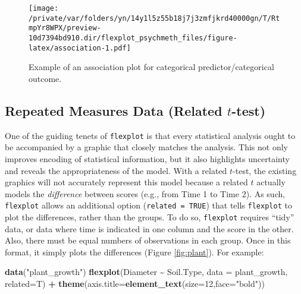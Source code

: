 \documentclass[
  english,
  man]{apa6}
\newenvironment{Shaded}{\begin{snugshade}}{\end{snugshade}}
\newcommand{\DataTypeTok}[1]{\textcolor[rgb]{0.13,0.29,0.53}{#1}}
\newcommand{\DecValTok}[1]{\textcolor[rgb]{0.00,0.00,0.81}{#1}}
\newcommand{\KeywordTok}[1]{\textcolor[rgb]{0.13,0.29,0.53}{\textbf{#1}}}
\newcommand{\NormalTok}[1]{#1}
\newcommand{\OperatorTok}[1]{\textcolor[rgb]{0.81,0.36,0.00}{\textbf{#1}}}
\newcommand{\StringTok}[1]{\textcolor[rgb]{0.31,0.60,0.02}{#1}}
\begin{document}
\begin{figure}
\centering
\texttt{[image: /private/var/folders/yn/14y1l5z55b18j7j3zmfjkrd40000gn/T/RtmpYr8WPX/preview-10d7394bd910.dir/flexplot\_psychmeth\_files/figure-latex/association-1.pdf]}
\caption{\label{fig:association}Example of an association plot for categorical predictor/categorical outcome.\label{fig:association}}
\end{figure}

\normalsize

\hypertarget{repeated-measures-data-related-t-test}{%
\subsection{\texorpdfstring{Repeated Measures Data (Related \(t\)-test)}{Repeated Measures Data (Related t-test)}}\label{repeated-measures-data-related-t-test}}

One of the guiding tenets of \texttt{flexplot} is that every statistical analysis ought to be accompanied by a graphic that closely matches the analysis. This not only improves encoding of statistical information, but it also highlights uncertainty and reveals the appropriateness of the model. With a related \(t\)-test, the existing graphics will not accurately represent this model because a related \(t\) actually models the \emph{difference} between scores (e.g., from Time 1 to Time 2). As such, \texttt{flexplot} allows an additional option (\texttt{related\ =\ TRUE}) that tells \texttt{flexplot} to plot the differences, rather than the groups. To do so, \texttt{flexplot} requires ``tidy'' data, or data where time is indicated in one column and the score in the other. Also, there must be equal numbers of observations in each group. Once in this format, it simply plots the differences (Figure \ref{fig:plant}). For example:

\small

\begin{Shaded}
\begin{Highlighting}[]
\KeywordTok{data}\NormalTok{(}\StringTok{"plant\_growth"}\NormalTok{)}
\KeywordTok{flexplot}\NormalTok{(Diameter }\OperatorTok{\textasciitilde{}}\StringTok{ }\NormalTok{Soil.Type, }\DataTypeTok{data =}\NormalTok{ plant\_growth, }\DataTypeTok{related=}\NormalTok{T) }\OperatorTok{+}
\StringTok{  }\KeywordTok{theme}\NormalTok{(}\DataTypeTok{axis.title=}\KeywordTok{element\_text}\NormalTok{(}\DataTypeTok{size=}\DecValTok{12}\NormalTok{,}\DataTypeTok{face=}\StringTok{"bold"}\NormalTok{))}
\end{Highlighting}
\end{Shaded}
\end{document}
